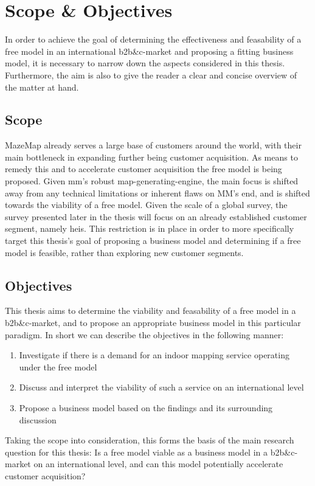 \section{Scope \& Objectives}
In order to achieve the goal of determining the effectiveness and feasability of a free model in an international \gls{b2b&c}-market and proposing a fitting business model, it is necessary to narrow down the aspects considered in this thesis. Furthermore, the aim is also to give the reader a clear and concise overview of the matter at hand.

\subsection{Scope}
MazeMap already serves a large base of customers around the world, with their main bottleneck in expanding further being customer acquisition. As means to remedy this and to accelerate customer acquisition the free model is being proposed. Given \gls{mm}'s robust map-generating-engine, the main focus is shifted away from any technical limitations or inherent flaws on \gls{MM}'s end, and is shifted towards the viability of a free model. Given the scale of a global survey, the survey presented later in the thesis will focus on an already established customer segment, namely \gls{hei}s. This restriction is in place in order to more specifically target this thesis's goal of proposing a business model and determining if a free model is feasible, rather than exploring new customer segments. 

\subsection{Objectives}
This thesis aims to determine the viability and feasability of a free model in a \gls{b2b&c}-market, and to propose an appropriate business model in this particular paradigm. In short we can describe the objectives in the following manner:
\begin{enumerate}
    \item Investigate if there is a demand for an indoor mapping service operating under the free model 
    \item Discuss and interpret the viability of such a service on an international level
    \item Propose a business model based on the findings and its surrounding discussion
\end{enumerate}
Taking the scope into consideration, this forms the basis of the main research question for this thesis: Is a free model viable as a business model in a \gls{b2b&c}-market on an international level, and can this model potentially accelerate customer acquisition?


